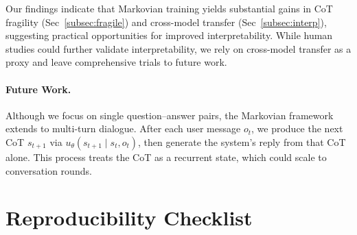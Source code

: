 \documentclass[letterpaper]{article} %
\begin{document}
Our findings indicate that Markovian training yields substantial gains in CoT fragility (Sec~\ref{subsec:fragile}) and cross-model transfer (Sec~\ref{subsec:interp}), suggesting practical opportunities for improved interpretability. While human studies could further validate interpretability, we rely on cross-model transfer as a proxy and leave comprehensive trials to future work.

\paragraph{Future Work.}
Although we focus on single question–answer pairs, the Markovian framework extends to multi-turn dialogue. After each user message $o_t$, we produce the next CoT $s_{t+1}$ via $u_\theta(s_{t+1}\mid s_t,o_t)$, then generate the system's reply from that CoT alone. This process treats the CoT as a recurrent state, which could scale to conversation rounds.




\section*{Reproducibility Checklist}

\def\isChecklistMainFile{}

\end{document}

